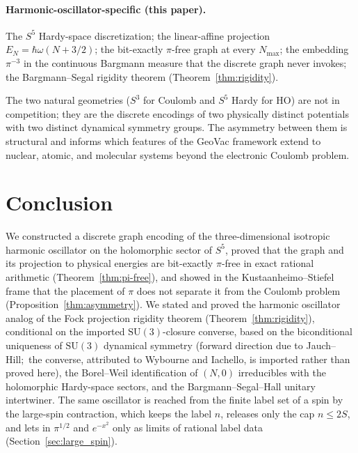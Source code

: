 \documentclass[twocolumn,pra,amsmath,amssymb,superscriptaddress]{revtex4-2}
\begin{document}
\paragraph{Harmonic-oscillator-specific (this paper).}
The $S^5$ Hardy-space discretization; the linear-affine
projection $E_N = \hbar\omega(N + 3/2)$; the bit-exactly
$\pi$-free graph at every $N_{\max}$; the embedding $\pi^{-3}$
in the continuous Bargmann measure that the discrete graph
never invokes; the Bargmann--Segal rigidity theorem
(Theorem~\ref{thm:rigidity}).

The two natural geometries ($S^3$ for Coulomb and $S^5$ Hardy
for HO) are not in competition; they are the discrete encodings
of two physically distinct potentials with two distinct
dynamical symmetry groups.  The asymmetry between them is
structural and informs which features of the GeoVac framework
extend to nuclear, atomic, and molecular systems beyond the
electronic Coulomb problem.

\section{Conclusion}
\label{sec:conclusion}

We constructed a discrete graph encoding of the three-dimensional
isotropic harmonic oscillator on the holomorphic sector of $S^5$,
proved that the graph and its projection to physical energies are
bit-exactly $\pi$-free in exact rational arithmetic
(Theorem~\ref{thm:pi-free}), and showed in the
Kustaanheimo--Stiefel frame that the placement of $\pi$ does not
separate it from the Coulomb problem (Proposition~\ref{thm:asymmetry}).  We
stated and proved the harmonic oscillator analog of the Fock
projection rigidity theorem (Theorem~\ref{thm:rigidity}),
conditional on the imported $\mathrm{SU}(3)$-closure converse, based on
the biconditional uniqueness of $\mathrm{SU}(3)$ dynamical
symmetry (forward direction due to Jauch--Hill;\ the converse,
attributed to Wybourne and Iachello, is imported rather than proved
here), the Borel--Weil identification of $(N, 0)$
irreducibles with the holomorphic Hardy-space sectors, and the
Bargmann--Segal--Hall unitary intertwiner.  The same oscillator is
reached from the finite label set of a spin by the large-spin
contraction, which keeps the label $n$, releases only the cap
$n \le 2S$, and lets in $\pi^{1/2}$ and $e^{-x^2}$ only as limits of
rational label data (Section~\ref{sec:large_spin}).
\end{document}
